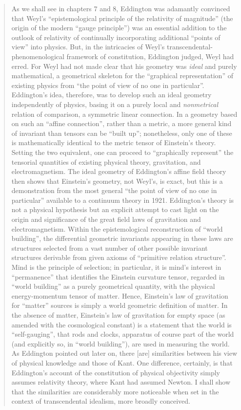 \begin{quote}
    As we shall see in chapters 7 and 8, Eddington was adamantly convinced that Weyl's ``epistemological principle of the relativity of magnitude'' (the origin of the modern ``gauge principle'') was an essential addition to the outlook of relativity of continually incorporating additional ``points of view'' into physics.  But, in the intricacies of Weyl's transcendental-phenomenological framework of constitution, Eddington judged, Weyl had erred.  For Weyl had not made clear that his geometry was \emph{ideal} and purely mathematical, a geometrical skeleton for the ``graphical representation'' of existing physics from ``the point of view of no one in particular''.  Eddington's idea, therefore, was to develop such an ideal geometry independently of physics, basing it on a purely local and \emph{nonmetrical} relation of comparison, a symmetric linear connection.  In a geometry based on such an ``affine connection'', rather than a metric, a more general kind of invariant than tensors can be ``built up''; nonetheless, only one of these is mathematically identical to the metric tensor of Einstein's theory.  Setting the two equivalent, one can proceed to ``graphically represent'' the tensorial quantities of existing physical theory, gravitation, and electromagnetism.  The ideal geometry of Eddington's affine field theory then shows that Einstein's geometry, not Weyl's, is exact, but this is a demonstration from the most general ``the point of view of no one in particular'' available to a continuum theory in 1921.  Eddington's theory is not a physical hypothesis but an explicit attempt to cast light on the origin and significance of the great field laws of gravitation and electromagnetism.  Within the epistemological reconstruction of ``world building'', the differential geometric invariants appearing in these laws are structures selected from a vast number of other possible invariant structures derivable from given axioms of ``primitive relation structure''.  Mind is the principle of selection; in particular, it is mind's interest in ``permanence'' that identifies the Einstein curvature tensor, regarded in ``world building'' as a purely geometrical quantity, with the physical energy-momentum tensor of matter.  Hence, Einstein's law of gravitation for ``matter'' sources is simply a world geometric definition of matter.  In the absence of matter, Einstein's law of gravitation for empty space (as amended with the cosmological constant) is a statement that the world is ``self-gauging'', that rods and clocks, apparatus of course part of the world (and explicitly so, in ``world building''), are used in measuring the world.  As Eddington pointed out later on, there [are] similarities between his view of physical knowledge and those of Kant.  One difference, certainly, is that Eddington's account of the constitution of physical objectivity simply assumes relativity theory, where Kant had assumed Newton.  I shall show that the similarities are considerably more noticeable when set in the context of transcendental idealism, more broadly conceived.
    

\end{quote}
